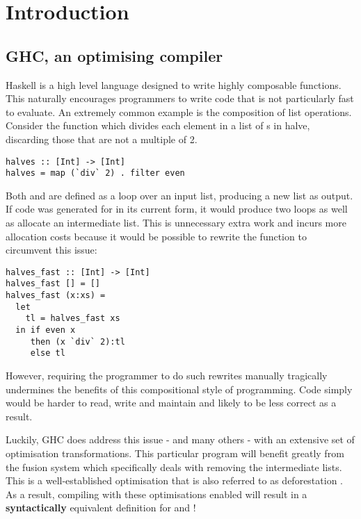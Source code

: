 \chapter{Introduction}

\section{GHC, an optimising compiler}

Haskell is a high level language designed to write highly composable functions.
This naturally encourages programmers to write code that
is not particularly fast to evaluate. An extremely common example is the composition
of list operations. Consider the function  which divides each element
in a list of s in halve, discarding those that are not a multiple of 2.

\begin{listing}[H]
\begin{verbatim}
halves :: [Int] -> [Int]
halves = map (`div` 2) . filter even
\end{verbatim}
\end{listing}

Both  and  are defined as a loop over an input list, producing a new list as output. 
If code was generated for  in its current form, it would produce two loops as well as allocate
an intermediate list. This is unnecessary extra work and incurs more allocation costs because
it would be possible to rewrite the function to circumvent this issue:


\begin{listing}[H]
\begin{verbatim}
halves_fast :: [Int] -> [Int]
halves_fast [] = []
halves_fast (x:xs) = 
  let 
    tl = halves_fast xs 
  in if even x 
     then (x `div` 2):tl
     else tl
\end{verbatim}
\end{listing}

However, requiring the programmer to do such rewrites manually tragically undermines
the benefits of this compositional style of programming. Code simply would be harder to read, write and
maintain and likely to be less correct as a result. 

Luckily, GHC does address this issue - and many others - with an extensive set of optimisation transformations.
This particular program will benefit greatly from the fusion system which specifically deals with removing
the intermediate lists. This is a well-established optimisation that is also referred to as deforestation \cite{WADLER1990231}.
As a result, compiling with these optimisations enabled will result in a \textbf{syntactically} equivalent
definition for  and ! 


